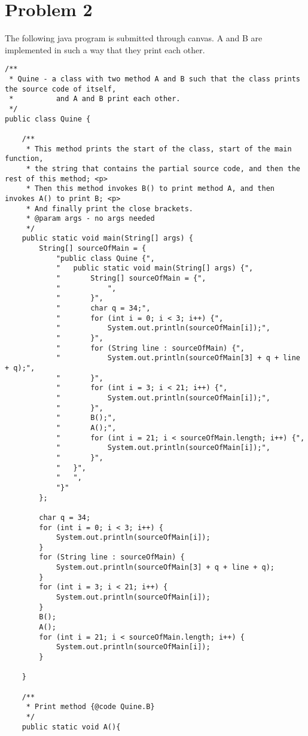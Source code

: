\documentclass[letterpaper]{article}
\begin{document}
\section*{Problem 2}
The following java program is submitted through canvas. A and B are implemented in such a way that they print each other.
\begin{verbatim}
/**
 * Quine - a class with two method A and B such that the class prints the source code of itself, 
 *          and A and B print each other.
 */
public class Quine {

    /**
     * This method prints the start of the class, start of the main function, 
     * the string that contains the partial source code, and then the rest of this method; <p>
     * Then this method invokes B() to print method A, and then invokes A() to print B; <p>
     * And finally print the close brackets.
     * @param args - no args needed
     */
    public static void main(String[] args) {
        String[] sourceOfMain = {
            "public class Quine {",
            "   public static void main(String[] args) {",
            "       String[] sourceOfMain = {",
            "           ",
            "       }",
            "       char q = 34;",
            "       for (int i = 0; i < 3; i++) {",
            "           System.out.println(sourceOfMain[i]);",
            "       }",
            "       for (String line : sourceOfMain) {",
            "           System.out.println(sourceOfMain[3] + q + line + q);",
            "       }",
            "       for (int i = 3; i < 21; i++) {",
            "           System.out.println(sourceOfMain[i]);",
            "       }",
            "       B();",
            "       A();",
            "       for (int i = 21; i < sourceOfMain.length; i++) {",
            "           System.out.println(sourceOfMain[i]);",
            "       }",
            "   }",
            "   ",
            "}"
        };

        char q = 34;
        for (int i = 0; i < 3; i++) {
            System.out.println(sourceOfMain[i]);
        }
        for (String line : sourceOfMain) {
            System.out.println(sourceOfMain[3] + q + line + q);
        }
        for (int i = 3; i < 21; i++) {
            System.out.println(sourceOfMain[i]);
        }
        B();
        A();
        for (int i = 21; i < sourceOfMain.length; i++) {
            System.out.println(sourceOfMain[i]);
        }

    }

    /**
     * Print method {@code Quine.B}
     */
    public static void A(){


\end{verbatim}
\end{document}
